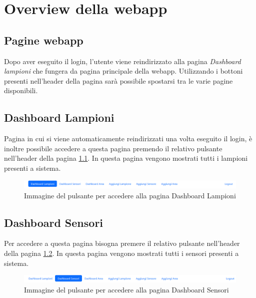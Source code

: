 \chapter{Overview della webapp}

\section{Pagine webapp}

Dopo aver eseguito il login, l'utente viene reindirizzato alla pagina \textit{Dashboard lampioni} che fungera da pagina principale della webapp. Utilizzando i bottoni presenti nell'header della pagina sarà possibile spostarsi tra le varie pagine disponibili.

\section{Dashboard Lampioni}

Pagina in cui si viene automaticamente reindirizzati una volta eseguito il login, è inoltre possibile accedere a questa pagina premendo il relativo pulsante nell'header della pagina \ref{fig:dash_lamp}. In questa pagina vengono mostrati tutti i lampioni presenti a sistema.

\begin{figure}[ht]
    \centering
    \includegraphics[width=\textwidth]{img/dash_lamp.png}
    \caption{Immagine del pulsante per accedere alla pagina Dashboard Lampioni}
    \label{fig:dash_lamp}
\end{figure}

\section{Dashboard Sensori}

Per accedere a questa pagina bisogna premere il relativo pulsante nell'header della pagina \ref{fig:dash_sens}. In questa pagina vengono mostrati tutti i sensori presenti a sistema.

\begin{figure}[ht]
    \centering
    \includegraphics[width=\textwidth]{img/dash_sens.png}
    \caption{Immagine del pulsante per accedere alla pagina Dashboard Sensori}
    \label{fig:dash_sens}
\end{figure}

